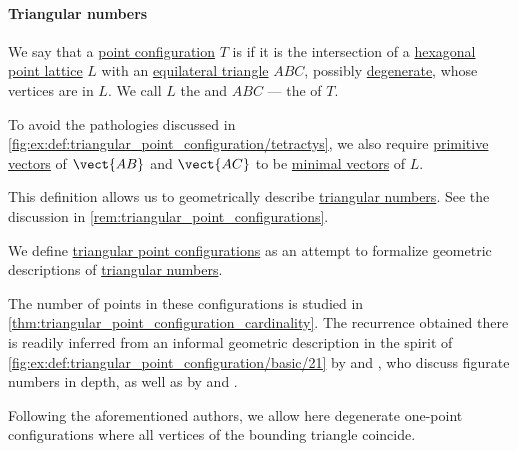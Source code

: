 \paragraph{Triangular numbers}

\begin{definition}\label{def:triangular_point_configuration}\mimprovised
  We say that a \hyperref[def:point_configuration]{point configuration} \( T \) is  if it is the intersection of a \hyperref[def:hexagonal_point_lattice]{hexagonal point lattice} \( L \) with an \hyperref[def:triangle/equilateral]{equilateral triangle} \( ABC \), possibly \hyperref[def:degenerate_polytope]{degenerate}, whose vertices are in \( L \). We call \( L \) the  and \( ABC \) --- the  of \( T \).

  To avoid the pathologies discussed in \cref{fig:ex:def:triangular_point_configuration/tetractys}, we also require \hyperref[def:primitive_lattice_vector]{primitive vectors} of \( \vect{AB} \) and \( \vect{AC} \) to be \hyperref[def:minimal_lattice_vector]{minimal vectors} of \( L \).
\end{definition}
\begin{comments}
  \item This definition allows us to geometrically describe \hyperref[def:triangular_number]{triangular numbers}. See the discussion in \cref{rem:triangular_point_configurations}.
\end{comments}

\begin{remark}\label{rem:triangular_point_configurations}
  We define \hyperref[def:triangular_point_configuration]{triangular point configurations} as an attempt to formalize geometric descriptions of \hyperref[def:triangular_number]{triangular numbers}.

  The number of points in these configurations is studied in \cref{thm:triangular_point_configuration_cardinality}. The recurrence obtained there is readily inferred from an informal geometric description in the spirit of \cref{fig:ex:def:triangular_point_configuration/basic/21} by \textcite[34]{ConwayGuy1998BookOfNumbers} and \textcite[4]{Deza2012FigurateNumbers}, who discuss figurate numbers in depth, as well as by \textcite[2]{Apostol1976AnalyticNumberTheory} and \textcite[14]{Розенфельд1963ОсновныеПонятиеГеометрии}.

  Following the aforementioned authors, we allow here degenerate one-point configurations where all vertices of the bounding triangle coincide.
\end{remark}

